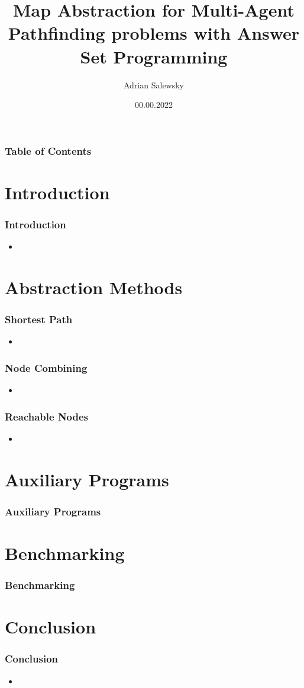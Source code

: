\documentclass{beamer}
\title{Map Abstraction for Multi-Agent Pathfinding problems with Answer Set Programming}
\author[Adrian Salewsky]{Adrian Salewsky}
\institute{University of Potsdam}
\date{00.00.2022}
\begin{document}
\frame{\titlepage}

\begin{frame}
\frametitle{Table of Contents}
\tableofcontents
\end{frame}

\section{Introduction} 
\begin{frame}
\frametitle{Introduction}
\begin{itemize}
\item<2-> 
\end{itemize}
\end{frame}


\section{Abstraction Methods}
\begin{frame}
\frametitle{Shortest Path}
\begin{itemize}
\item<2-> 
\end{itemize}
\end{frame}

\begin{frame}
\frametitle{Node Combining}
\begin{itemize}
\item<2-> 
\end{itemize}
\end{frame}

\begin{frame}
\frametitle{Reachable Nodes}
\begin{itemize}
\item<2-> 
\end{itemize}
\end{frame}

\section{Auxiliary Programs}
\begin{frame}
\frametitle{Auxiliary Programs}
\end{frame}

\section{Benchmarking}
\begin{frame}
\frametitle{Benchmarking}
\end{frame}

\section{Conclusion}
\begin{frame}
\frametitle{Conclusion}
\begin{itemize}
\item<2-> 
\end{itemize}
\end{frame}
\end{document}
